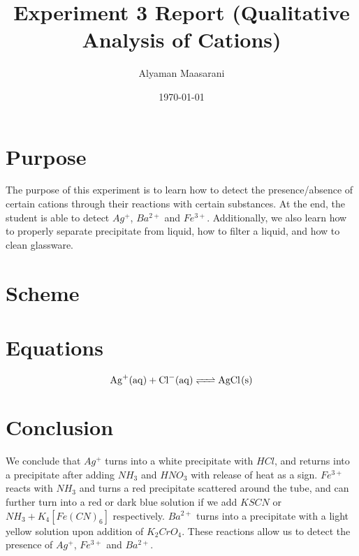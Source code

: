 \documentclass[11pt]{article}
\author{Alyaman Maasarani}
\date{\today}
\title{Experiment 3 Report (Qualitative Analysis of Cations)}
\begin{document}
\maketitle
\tableofcontents


\section{Purpose}
\label{sec:org33dd161}
The purpose of this experiment is to learn how to detect the presence/absence of certain cations through their reactions with certain substances. At the end, the student is able to detect \(Ag^{+}\), \(Ba^{2+}\) and \(Fe^{3+}\). Additionally, we also learn how to properly separate precipitate from liquid, how to filter a liquid, and how to clean glassware.

\section{Scheme}
\label{sec:org9afc1ef}
\begin{center}
  \makebox[0pt]{\scalebox{0.85}{}}
\end{center}


\section{Equations}
\[\ce{Ag^{+}(aq) + Cl^{-}(aq) <=> AgCl(s)}\]

\section{Conclusion}
\label{sec:orgf90cc25}
We conclude that \(Ag^+\) turns into a white precipitate with \(HCl\), and returns into a precipitate after adding \(NH_3\) and \(HNO_3\) with release of heat as a sign. \(Fe^{3+}\) reacts with \(NH_3\) and turns a red precipitate scattered around the tube, and can further turn into a red or dark blue solution if we add \(KSCN\) or \(NH_3 + K_4[Fe(CN)_6]\) respectively. \(Ba^{2+}\) turns into a precipitate with a light yellow solution upon addition of \(K_2CrO_4\). These reactions allow us to detect the presence of \(Ag^+\), \(Fe^{3+}\) and \(Ba^{2+}\).
\end{document}
